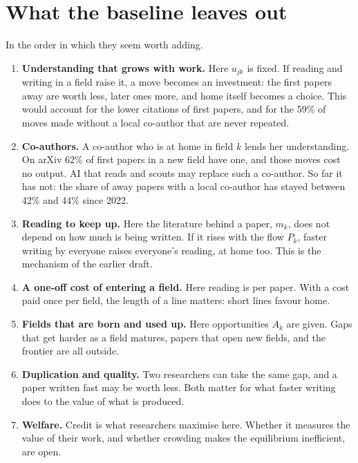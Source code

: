 \documentclass[11pt,letterpaper]{article}
\begin{document}
\section{What the baseline leaves out}\label{sec:out}

In the order in which they seem worth adding.

\begin{enumerate}[leftmargin=1.7em]
\item \textbf{Understanding that grows with work.} Here $u_{jk}$ is fixed. If reading and writing in a field raise it, a move becomes an investment: the first papers away are worth less, later ones more, and home itself becomes a choice. This would account for the lower citations of first papers, and for the 59\% of moves made without a local co-author that are never repeated.
\item \textbf{Co-authors.} A co-author who is at home in field $k$ lends her understanding. On arXiv 62\% of first papers in a new field have one, and those moves cost no output. AI that reads and scouts may replace such a co-author. So far it has not: the share of away papers with a local co-author has stayed between 42\% and 44\% since 2022.
\item \textbf{Reading to keep up.} Here the literature behind a paper, $m_k$, does not depend on how much is being written. If it rises with the flow $P_k$, faster writing by everyone raises everyone's reading, at home too. This is the mechanism of the earlier draft.
\item \textbf{A one-off cost of entering a field.} Here reading is per paper. With a cost paid once per field, the length of a line matters: short lines favour home.
\item \textbf{Fields that are born and used up.} Here opportunities $A_k$ are given. Gaps that get harder as a field matures, papers that open new fields, and the frontier are all outside.
\item \textbf{Duplication and quality.} Two researchers can take the same gap, and a paper written fast may be worth less. Both matter for what faster writing does to the value of what is produced.
\item \textbf{Welfare.} Credit is what researchers maximise here. Whether it measures the value of their work, and whether crowding makes the equilibrium inefficient, are open.
\end{enumerate}

\appendix
\end{document}

